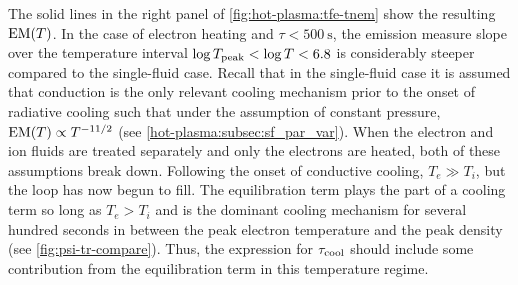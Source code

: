 The solid lines in the right panel of \autoref{fig:hot-plasma:tfe-tnem} show the resulting $\emd[T]$. In the case of electron heating and $\tau<\SI{500}{\second}$, the emission measure slope over the temperature interval $\log{T_\textup{peak}}<\log{T}<6.8$ is considerably steeper compared to the single-fluid case. Recall that in the single-fluid case it is assumed that conduction is the only relevant cooling mechanism prior to the onset of radiative cooling such that under the assumption of constant pressure, $\emd[T] \propto T^{-11/2}$ (see \autoref{hot-plasma:subsec:sf_par_var}). When the electron and ion fluids are treated separately and only the electrons are heated, both of these assumptions break down. Following the onset of conductive cooling, $T_e \gg T_i$, but the loop has now begun to fill. The equilibration term plays the part of a cooling term so long as $T_e>T_i$ and is the dominant cooling mechanism for several hundred seconds in between the peak electron temperature and the peak density (see \autoref{fig:psi-tr-compare}). Thus, the expression for $\tau_\textup{cool}$ should include some contribution from the equilibration term in this temperature regime.

